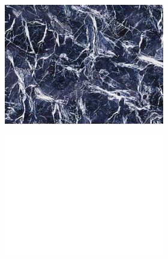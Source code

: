 \begin{figure}[]
    \centering    
    \begin{subfigure}{\textwidth}
        \centering
        \begin{subfigure}{0.19\textwidth}
            \centering
            \includegraphics[width=\textwidth]{images/04-experiment02/isolating_issues/target.jpg}
        \end{subfigure}
        \hfill
        \begin{subfigure}{0.19\textwidth}
            \centering
            \includegraphics[width=\textwidth]{images/04-experiment02/isolating_issues/255_bg.jpg}
        \end{subfigure}
        \hfill
        \begin{subfigure}{0.6\textwidth}

\end{subfigure}
\end{subfigure}
\end{figure}
